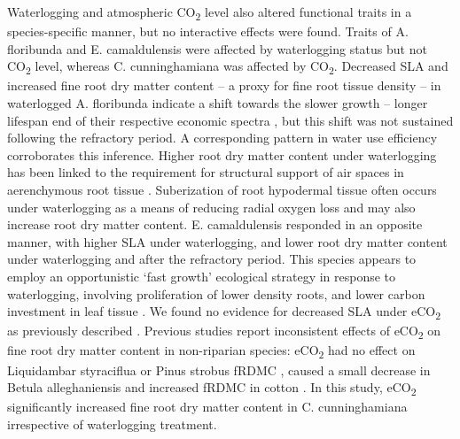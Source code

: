 \documentclass[12pt,a4paper]{memoir}
\begin{document}
Waterlogging and atmospheric CO\textsubscript{2} level also altered functional traits in a species-specific manner, but no interactive effects were found. Traits of A. floribunda and E. camaldulensis were affected by waterlogging status but not CO\textsubscript{2} level, whereas C. cunninghamiana was affected by CO\textsubscript{2}. Decreased SLA and increased fine root dry matter content – a proxy for fine root tissue density \citep{Birouste2013} – in waterlogged A. floribunda indicate a shift towards the slower growth – longer lifespan  end of their respective economic spectra \citep{Reich2014}, but this shift was not sustained following the refractory period. A corresponding pattern in water use efficiency corroborates this inference. Higher root dry matter content under waterlogging has been linked to the requirement for structural support of air spaces in aerenchymous root tissue \citep{Ryser2011}. Suberization of root hypodermal tissue often occurs under waterlogging as a means of reducing radial oxygen loss \citep{Visser2000, DeSimone2002} and may also increase root dry matter content. E. camaldulensis responded in an opposite manner, with higher SLA under waterlogging, and lower root dry matter content under waterlogging and after the refractory period. This species appears to employ an opportunistic ‘fast growth’ ecological strategy in response to waterlogging, involving proliferation of lower density roots, and lower carbon investment in leaf tissue \citep{Wright2004, Reich2014}. We found no evidence for decreased SLA under eCO\textsubscript{2} as previously described \citep{Poorter2003a}. Previous studies report inconsistent effects of eCO\textsubscript{2} on fine root dry matter content in non-riparian species: eCO\textsubscript{2} had no effect on Liquidambar styraciflua or Pinus strobus fRDMC \citep{Bauer2001,Iversen2008}, caused a small decrease in Betula alleghaniensis \citep{Bauer2001} and increased fRDMC in cotton \citep{Prior1994}. In this study, eCO\textsubscript{2} significantly increased fine root dry matter content in C. cunninghamiana irrespective of waterlogging treatment.
\end{document}
